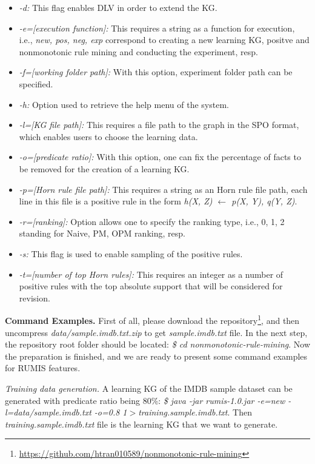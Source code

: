 \begin{itemize}
\item \textit{-d:} This flag enables DLV in order to extend the KG.
\item \textit{-e=[execution function]:} This requires a string as a function for execution, i.e., \textit{new, pos, neg, exp} correspond to creating a new learning KG, positve and nonmonotonic rule mining and conducting the experiment, resp.
\item \textit{-f=[working folder path]:} With this option, experiment folder path can be specified.
\item \textit{-h:} Option used to retrieve the help menu of the system.
\item \textit{-l=[KG file path]:} This requires a file path to the graph in the SPO format, which enables users to choose the learning data.
\item \textit{-o=[predicate ratio]:} With this option, one can fix the percentage of facts to be removed for the creation of a learning KG.
\item \textit{-p=[Horn rule file path]:} This requires a string as an Horn rule file path, each line in this file is a positive rule in the form \textit{h(X, Z) $\leftarrow$ p(X, Y), q(Y, Z)}.
\item \textit{-r=[ranking]:} Option allows one to specify the ranking type, i.e., 0, 1, 2 standing for Naive, PM, OPM ranking, resp.
\item \textit{-s:} This flag is used to enable sampling of the positive rules.
\item \textit{-t=[number of top Horn rules]:} This requires an integer as a number of positive rules with the top absolute support that will be considered for revision.
\end{itemize}

\textbf{Command Examples.} First of all, please download the repository\footnote{\url{https://github.com/htran010589/nonmonotonic-rule-mining}}, and then uncompress \textit{data/sample.imdb.txt.zip} to get \textit{sample.imdb.txt} file. In the next step, the repository root folder should be located: \textit{\$ cd nonmonotonic-rule-mining}. Now the preparation is finished, and we are ready to present some command examples for RUMIS features.

\textit{Training data generation.} A learning KG of the IMDB sample dataset can be generated with predicate ratio being 80\%: \textit{\$ java -jar rumis-1.0.jar -e=new -l=data/sample.imdb.txt -o=0.8 1$>$training.sample.imdb.txt}. Then \textit{training.sample.imdb.txt} file is the learning KG that we want to generate.

